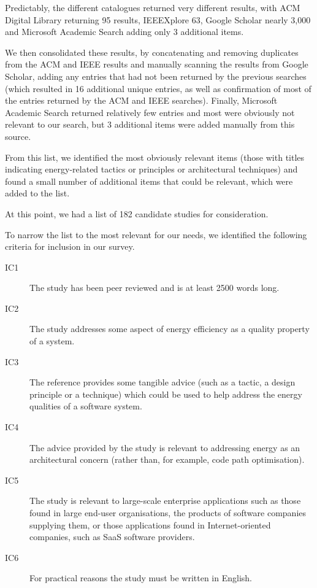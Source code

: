 Predictably, the different catalogues returned very different results, with ACM Digital Library returning 95 results, IEEEXplore 63, Google Scholar nearly 3,000 and Microsoft Academic Search adding only 3 additional items.

We then consolidated these results, by concatenating and removing duplicates from the ACM and IEEE results and manually scanning the results from Google Scholar, adding any entries that had not been returned by the previous searches (which resulted in 16 additional unique entries, as well as confirmation of most of the entries returned by the ACM and IEEE searches).  Finally, Microsoft Academic Search returned relatively few entries and most were obviously not relevant to our search, but 3 additional items were added manually from this source.

From this list, we identified the most obviously relevant items (those with titles indicating energy-related tactics or principles or architectural techniques) and found a small number of additional items that could be relevant, which were added to the list.

At this point, we had a list of 182 candidate studies for consideration.

To narrow the list to the most relevant for our needs, we identified the following criteria for inclusion in our survey.

\begin{description}
	\item[IC1] The study has been peer reviewed and is at least 2500 words long.
	\item[IC2] The study addresses some aspect of energy efficiency as a quality property of a system.
	\item[IC3] The reference provides some tangible advice (such as a tactic, a design principle or a technique) which could be used to help address the energy qualities of a software system.
	\item[IC4] The advice provided by the study is relevant to addressing energy as an architectural concern (rather than, for example, code path optimisation).
	\item[IC5] The study is relevant to large-scale enterprise applications such as those found in large end-user organisations, the products of software companies supplying them, or those applications found in Internet-oriented companies, such as SaaS software providers.
	\item[IC6] For practical reasons the study must be written in English.
\end{description}

